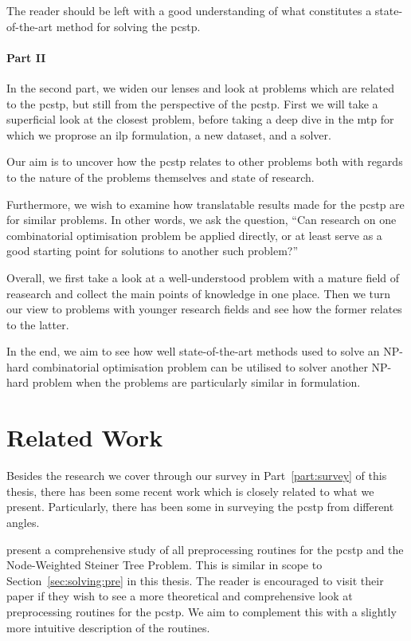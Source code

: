 The reader should be left with a good understanding of
what constitutes a state-of-the-art method for solving the \gls{pcstp}.

\paragraph{Part II}

In the second part, we widen our lenses and look at problems which are related to the \gls{pcstp},
but still from the perspective of
the \gls{pcstp}.
First we will take a superficial look at the closest problem,
before taking a deep dive in the \acrlong{mtp} for which
we proprose an \gls{ilp} formulation, a new dataset, and a solver.

Our aim is to uncover how the \gls{pcstp} relates to other problems
both with regards to the nature of the problems themselves and state of
research.

Furthermore, we wish to examine how translatable results made for the \gls{pcstp} are for similar problems.
In other words, we ask the question,
``Can research on one combinatorial optimisation problem be applied directly, or at least
serve as a good starting point for solutions to another such problem?''

\medskip\noindent
Overall, we first take a look at a well-understood problem with a mature field of reasearch and collect
the main points of knowledge in one place. Then we turn our view to problems with younger research fields
and see how the former relates to the latter.

In the end, we aim to see how well state-of-the-art methods used to solve an NP-hard combinatorial
optimisation problem can be utilised to solver another NP-hard problem when the problems are particularly
similar in formulation.

\section{Related Work}
Besides the research we cover through our survey in
Part~\ref{part:survey} of this thesis,
there has been some recent work which is closely related
 to what we present. Particularly, there has been some in surveying the
\acrlong{pcstp} from different angles.

\citet*{rehfeldt2016reduction} present a comprehensive study of all preprocessing routines
for the \gls{pcstp} and the Node-Weighted Steiner Tree Problem. This is similar in scope to
Section~\ref{sec:solving:pre} in this thesis. The reader is encouraged to visit their paper
if they wish to see a more theoretical and comprehensive look at preprocessing routines for
the \gls{pcstp}. We aim to complement this with a slightly more intuitive description of the
routines.

